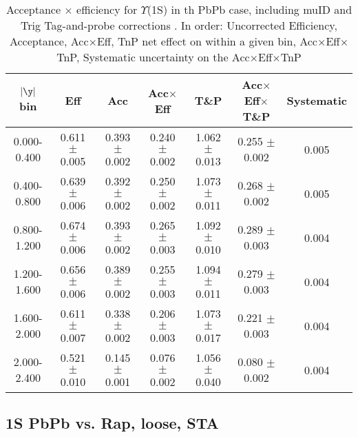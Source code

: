 \begin{table}[h]
\begin{center}
\begin{tabular}{|c|c|c|c|c|c|c|}
\hline
$\vert\y\vert$ bin& Eff & Acc & Acc$\times$Eff & T\&P & Acc$\times$Eff$\times$T\&P  & Systematic \\
\hline 
0.000-0.400 & 0.611 $\pm$ 0.005 & 0.393 $\pm$ 0.002 & 0.240 $\pm$ 0.002 & 1.062 $\pm$ 0.013 & 0.255 $\pm$ 0.002 & 0.005 \\
0.400-0.800 & 0.639 $\pm$ 0.006 & 0.392 $\pm$ 0.002 & 0.250 $\pm$ 0.002 & 1.073 $\pm$ 0.011 & 0.268 $\pm$ 0.002 & 0.005 \\
0.800-1.200 & 0.674 $\pm$ 0.006 & 0.393 $\pm$ 0.002 & 0.265 $\pm$ 0.003 & 1.092 $\pm$ 0.010 & 0.289 $\pm$ 0.003 & 0.004 \\
1.200-1.600 & 0.656 $\pm$ 0.006 & 0.389 $\pm$ 0.002 & 0.255 $\pm$ 0.003 & 1.094 $\pm$ 0.011 & 0.279 $\pm$ 0.003 & 0.004 \\
1.600-2.000 & 0.611 $\pm$ 0.007 & 0.338 $\pm$ 0.002 & 0.206 $\pm$ 0.003 & 1.073 $\pm$ 0.017 & 0.221 $\pm$ 0.003 & 0.004 \\
2.000-2.400 & 0.521 $\pm$ 0.010 & 0.145 $\pm$ 0.001 & 0.076 $\pm$ 0.002 & 1.056 $\pm$ 0.040 & 0.080 $\pm$ 0.002 & 0.004 \\
\hline                           
\end{tabular}
\caption{Acceptance $\times$ efficiency for $\Upsilon$(1S) in th PbPb
case, including muID and Trig Tag-and-probe corrections . In order: Uncorrected Efficiency, Acceptance, Acc$\times$Eff,
TnP net effect on within a given bin, Acc$\times$Eff$\times$TnP,
Systematic uncertainty on the  Acc$\times$Eff$\times$TnP }
\label{Aet_1S_pyquen_rap2014_muIDTrig}
\end{center}
\end{table}


\subsection{1S PbPb vs. Rap, loose, STA}

